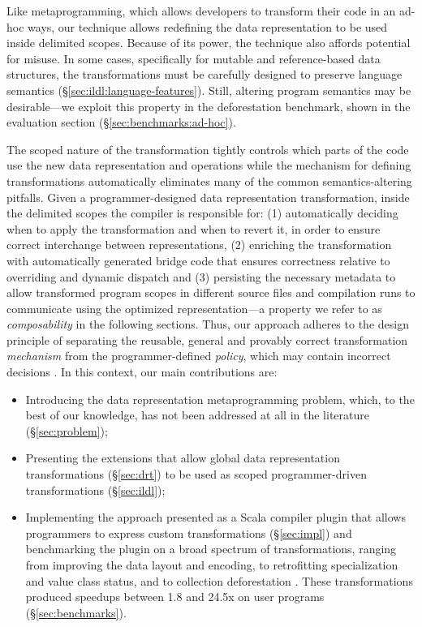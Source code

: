 Like metaprogramming, which allows developers to transform their code in an ad-hoc ways, our technique allows redefining the data representation to be used inside delimited scopes. Because of its power, the technique also affords potential for misuse. In some cases, specifically for mutable and reference-based data structures, the transformations must be carefully designed to preserve language semantics
(\S\ref{sec:ildl:language-features}). Still, altering program semantics may be desirable---we exploit this property in the deforestation benchmark, shown in the evaluation section (\S\ref{sec:benchmarks:ad-hoc}).

The scoped nature of the transformation tightly controls which parts of the code use the new data representation and operations while the mechanism for defining transformations automatically eliminates
many of the common semantics-altering pitfalls. Given a programmer-designed data representation transformation, inside the delimited scopes the compiler is responsible for: (1) automatically deciding when to apply the transformation and when to revert it, in order to ensure correct interchange between representations, (2) enriching the transformation with automatically generated bridge code that ensures correctness relative to overriding and dynamic dispatch and (3) persisting the necessary metadata to allow transformed program scopes in different source files and compilation runs to communicate using the optimized representation---a property we refer to as \emph{composability} in the following sections. Thus, our approach adheres to the design principle of separating the reusable, general and provably correct transformation \emph{mechanism} from the programmer-defined \emph{policy}, which may contain incorrect decisions \cite{lampson-mechanism-policy}. In this context, our main contributions are:

\begin{itemize}
  \item Introducing the data representation metaprogramming problem, which, to the best of our knowledge, has not been addressed at all in the literature (\S\ref{sec:problem});
  \item Presenting the extensions that allow global data representation transformations (\S\ref{sec:drt}) to be used as scoped programmer-driven transformations (\S\ref{sec:ildl});
  \item Implementing the approach presented as a Scala compiler plugin \cite{ildl-plugin} that allows programmers to express custom transformations (\S\ref{sec:impl}) and benchmarking the plugin on a broad spectrum of transformations, ranging from improving the data layout and encoding, to retrofitting specialization and value class status, and to collection deforestation \cite{wadler-deforestation}. These transformations produced  speedups between 1.8 and 24.5x on user programs (\S\ref{sec:benchmarks}).
\end{itemize}
